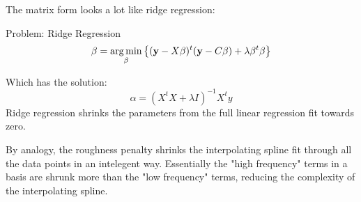 %
%
\begin{frame}
  The matrix form looks a lot like ridge regression:
  \begin{block}{Problem: Ridge Regression}
    $$ \beta = \operatorname*{arg\,min}_{\beta} \left\{ (\mathbf{y} - X \beta)^t (\mathbf{y} - C \beta) + \lambda \beta^t \beta \right\} $$
 \end{block}
 Which has the solution:
 $$ \alpha = ( X^t X + \lambda I )^{-1} X^t y $$
 Ridge regression shrinks the parameters from the full linear regression fit towards zero.
\end{frame}
%
%
\begin{frame}
  By analogy, the roughness penalty shrinks the interpolating spline fit through all the data points in an intelegent way.  Essentially the "high frequency" terms in a basis are shrunk more than the "low frequency" terms, reducing the complexity of the interpolating spline.
\end{frame}
